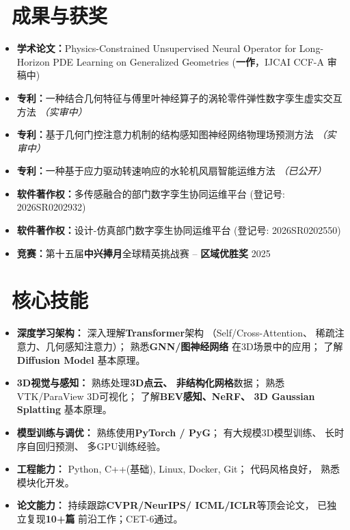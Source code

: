 \documentclass[11pt]{article}
\begin{document}
\section{%
    \makebox[\widthof{\faTrophy}][c]%
    {\color{CVBlue}\faTrophy}\ 成果与获奖%
}

\begin{itemize}
    \item \textbf{学术论文：}Physics-Constrained Unsupervised Neural Operator for Long-Horizon PDE Learning on Generalized Geometries (\textbf{一作}，IJCAI CCF-A 审稿中)
    \item \textbf{专利：}一种结合几何特征与傅里叶神经算子的涡轮零件弹性数字孪生虚实交互方法 \textit{（实审中）}
    \item \textbf{专利：}基于几何门控注意力机制的结构感知图神经网络物理场预测方法 \textit{（实审中）}
    \item \textbf{专利：}一种基于应力驱动转速响应的水轮机风扇智能运维方法 \textit{（已公开）}
    \item \textbf{软件著作权：}多传感融合的部门数字孪生协同运维平台 (登记号: 2026SR0202932)
    \item \textbf{软件著作权：}设计-仿真部门数字孪生协同运维平台 (登记号: 2026SR0202550)
    \item \textbf{竞赛：}第十五届\textbf{中兴捧月}全球精英挑战赛 -- \textbf{区域优胜奖} \hfill 2025
\end{itemize}

  
\section{\makebox[\widthof{\faCogs}][c]
{\color{CVBlue}\faCogs}\ 核心技能}
    
\begin{itemize}
    \item \textbf{深度学习架构：}
    深入理解\textbf{Transformer}架构
    （Self/Cross-Attention、
    稀疏注意力、几何感知注意力）；
    熟悉\textbf{GNN/图神经网络}
    在3D场景中的应用；
    了解\textbf{Diffusion Model}
    基本原理。
    
    \item \textbf{3D视觉与感知：}
    熟练处理\textbf{3D点云、
    非结构化网格}数据；
    熟悉VTK/ParaView 3D可视化；
    了解\textbf{BEV感知、NeRF、
    3D Gaussian Splatting}
    基本原理。
    
    \item \textbf{模型训练与调优：}
    熟练使用\textbf{PyTorch / PyG}；
    有大规模3D模型训练、
    长时序自回归预测、
    多GPU训练经验。
    
    \item \textbf{工程能力：}
    Python, C++(基础), 
    Linux, Docker, Git；
    代码风格良好，
    熟悉模块化开发。
    
    \item \textbf{论文能力：}
    持续跟踪\textbf{CVPR/NeurIPS/
    ICML/ICLR}等顶会论文，
    已独立复现\textbf{10+篇}
    前沿工作；CET-6通过。
\end{itemize}
\end{document}
